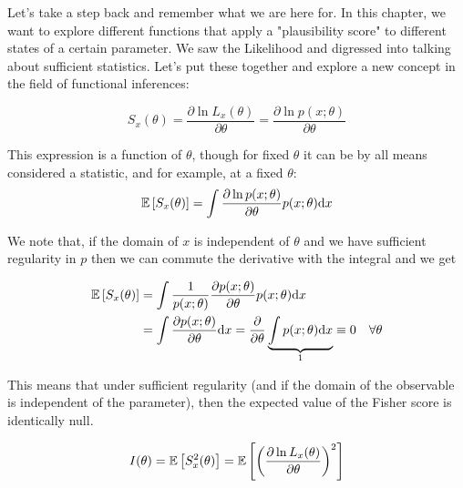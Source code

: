 Let's take a step back and remember what we are here for. In this chapter, we want to explore different functions that apply a "plausibility score" to different states of a certain parameter. We saw the Likelihood and digressed into talking about sufficient statistics. Let's put these together and explore a new concept in the field of functional inferences:

\begin{definition}
	\[
	S_x(\theta) = \frac{\partial \ln L_x(\theta)}{\partial \theta} = \frac{\partial \ln p(x;\theta)}{\partial \theta}
	\]
\label{def:Fisher_S}
\end{definition}

This expression is a function of $\theta$, though for fixed $\theta$ it can be by all means considered a statistic, and for example, at a fixed $\theta$:
	\[
	\mathbb{E}\left[ S_x(\theta) \right] = \int \frac{\partial \ln p(x;\theta)}{\partial \theta}p(x;\theta)\mathrm{d} x
	\]

We note that, if the domain of $x$ is independent of $\theta$ and we have sufficient regularity in $p$ then we can commute the derivative with the integral and we get

	\begin{align*}
	\mathbb{E}\left[ S_x(\theta) \right] &= \int\frac{1}{p(x;\theta)}\frac{\partial p(x;\theta)}{\partial \theta} p(x;\theta) \mathrm{d} x \\
	&= \int \frac{\partial p(x;\theta)}{\partial\theta} \mathrm{d} x = \frac{\partial}{\partial \theta}\underbrace{\int p(x;\theta)\mathrm{d} x}_1 \equiv 0\quad \forall \theta
	\end{align*}

This means that under sufficient regularity (and if the domain of the observable is independent of the parameter), then the expected value of the Fisher score is identically null.

\begin{definition}\label{def:fisher_information}
	\[
	I(\theta) = \mathbb{E}\left[ S^2_x(\theta) \right] = \mathbb{E}\left[\left( \frac{\partial \ln L_x(\theta)}{\partial\theta}\right)^2\right]
	\]
\end{definition}

